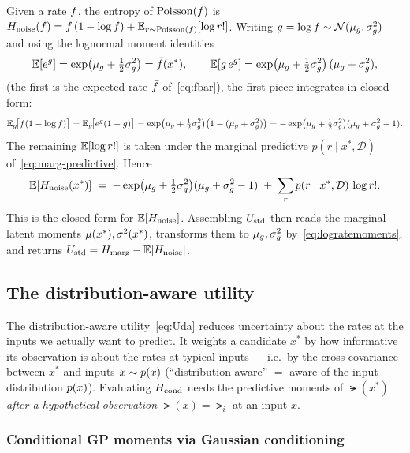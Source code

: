 Given a rate $f$, the entropy of $\mathrm{Poisson}(f)$ is
$H_{\mathrm{noise}}(f)=f\,(1-\log f)+\mathbb{E}_{r\sim\mathrm{Poisson}(f)}[\log r!]$. Writing
$g=\log f\sim\mathcal{N}(\mu_{g},\sigma_{g}^{2})$ and using the lognormal moment identities
%
\begin{equation}
  \mathbb{E}[e^{g}] = \exp\!\big(\mu_{g}+\tfrac12\sigma_{g}^{2}\big) = \bar{f}(x^{*}),
  \qquad
  \mathbb{E}[g\,e^{g}] = \exp\!\big(\mu_{g}+\tfrac12\sigma_{g}^{2}\big)\,(\mu_{g}+\sigma_{g}^{2}),
  \label{eq:lognormal-identities}
\end{equation}
%
(the first is the expected rate $\bar{f}$ of~\eqref{eq:fbar}), the first piece
integrates in closed form:
%
\begin{equation}
  \mathbb{E}_{g}\!\big[f(1-\log f)\big]
  = \mathbb{E}_{g}\!\big[e^{g}(1-g)\big]
  = \exp\!\big(\mu_{g}+\tfrac12\sigma_{g}^{2}\big)\big(1-(\mu_{g}+\sigma_{g}^{2})\big)
  = -\exp\!\big(\mu_{g}+\tfrac12\sigma_{g}^{2}\big)(\mu_{g}+\sigma_{g}^{2}-1).
  \label{eq:hnoise-firstpiece}
\end{equation}
%
The remaining $\mathbb{E}[\log r!]$ is taken under the marginal predictive
$p(r\mid x^{*},\mathcal D)$ of~\eqref{eq:marg-predictive}. Hence
%
\begin{equation}
  \mathbb{E}[H_{\mathrm{noise}}(x^{*})]
  \;=\; -\exp\!\big(\mu_{g}+\tfrac12\sigma_{g}^{2}\big)(\mu_{g}+\sigma_{g}^{2}-1)
        \;+\; \sum_{r} p(r\mid x^{*},\mathcal D)\,\log r! .
  \label{eq:Hnoise}
\end{equation}
%
This is the closed form for $\mathbb{E}[H_{\mathrm{noise}}]$.
Assembling $U_{\mathrm{std}}$ then reads the marginal latent moments
$\mu(x^{*}),\sigma^{2}(x^{*})$, transforms them to $\mu_{g},\sigma_{g}^{2}$
by~\eqref{eq:logratemoments}, and returns $U_{\mathrm{std}}=H_{\mathrm{marg}}-\mathbb{E}[H_{\mathrm{noise}}]$.

\subsection{The distribution-aware utility}
\label{subsec:da}

The distribution-aware utility~\eqref{eq:Uda} reduces uncertainty about the rates at
the inputs we actually want to predict. It weights a candidate $x^{*}$ by how
informative its observation is about the rates at typical inputs --- i.e.\ by the
cross-covariance between $x^{*}$ and inputs $x\sim p(x)$ (``distribution-aware'' $=$
aware of the input distribution $p(x)$). Evaluating $H_{\mathrm{cond}}$ needs the predictive
moments of $\lat(x^{*})$ \emph{after a hypothetical observation} $\lat(x)=\lat_i$ at
an input $x$.

\subsubsection{Conditional GP moments via Gaussian conditioning}
\label{subsubsec:condmoments}

